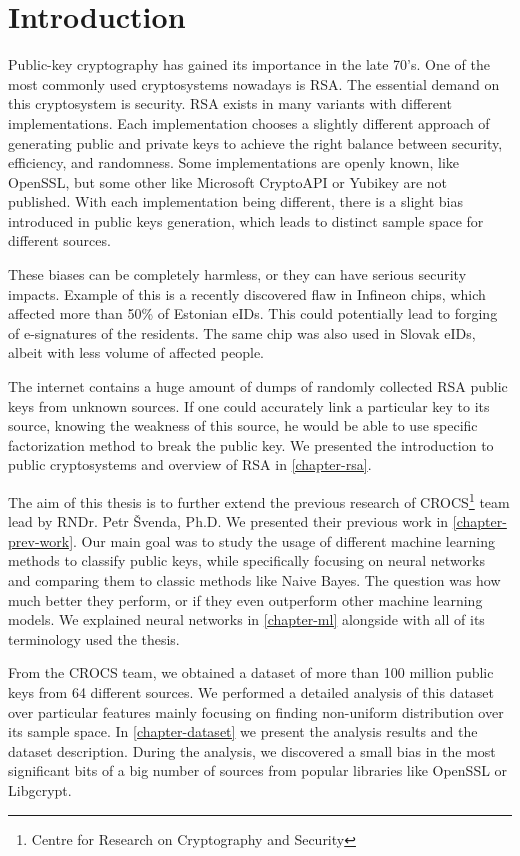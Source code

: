 \chapter{Introduction}

Public-key cryptography has gained its importance in the late 70's. One of the most commonly used cryptosystems nowadays is RSA. The essential demand on this cryptosystem is security. RSA exists in many variants with different implementations. Each implementation chooses a slightly different approach of generating public and private keys to achieve the right balance between security, efficiency, and randomness. Some implementations are openly known, like OpenSSL, but some other like Microsoft CryptoAPI or Yubikey are not published. With each implementation being different, there is a slight bias introduced in public keys generation, which leads to distinct sample space for different sources. 

These biases can be completely harmless, or they can have serious security impacts. Example of this is a recently discovered flaw in Infineon chips\cite{svenda_2}, which affected more than 50\% of Estonian eIDs. This could potentially lead to forging of e-signatures of the residents. The same chip was also used in Slovak eIDs, albeit with less volume of affected people.

The internet contains a huge amount of dumps of randomly collected RSA public keys from unknown sources. If one could accurately link a particular key to its source, knowing the weakness of this source, he would be able to use specific factorization method to break the public key. We presented the introduction to public cryptosystems and overview of RSA in \autoref{chapter-rsa}.

The aim of this thesis is to further extend the previous research of CROCS\footnote{Centre for Research on Cryptography and Security} team \cite{svenda_1}\cite{svenda_3} lead by RNDr. Petr Švenda, Ph.D. We presented their previous work in \autoref{chapter-prev-work}. Our main goal was to study the usage of different machine learning methods to classify public keys, while specifically focusing on neural networks and comparing them to classic methods like Naive Bayes. The question was how much better they perform, or if they even outperform other machine learning models. We explained neural networks in \autoref{chapter-ml} alongside with all of its terminology used the thesis.

From the CROCS team, we obtained a dataset of more than 100 million public keys from 64 different sources. We performed a detailed analysis of this dataset over particular features mainly focusing on finding non-uniform distribution over its sample space. In \autoref{chapter-dataset} we present the analysis results and the dataset description. During the analysis, we discovered a small bias in the most significant bits of a big number of sources from popular libraries like OpenSSL or Libgcrypt.

